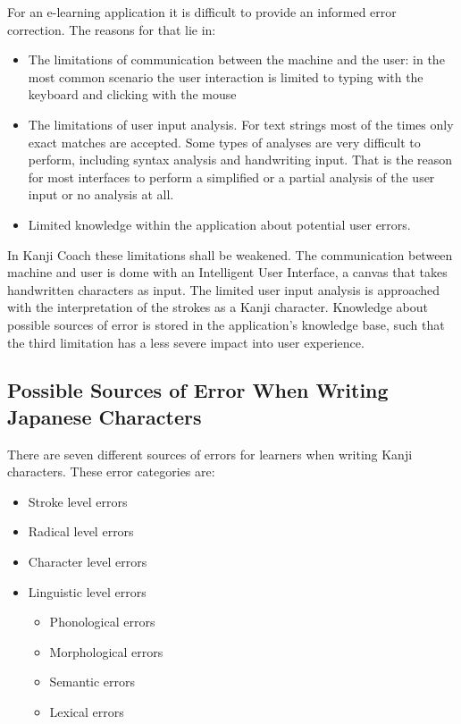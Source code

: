 For an e-learning application it is difficult to provide an informed error 
correction. The reasons for that lie in:
\begin{itemize}
  \item The limitations of communication between the machine and the user:
        in the most common scenario the user interaction is limited to
        typing with the keyboard and clicking with the mouse
  \item The limitations of user input analysis. For text strings most of the
        times only exact matches are accepted. Some types of analyses are very
        difficult to perform, including syntax analysis and handwriting input.
        That is the reason for most interfaces to perform a simplified
        or a partial analysis of the user input or no analysis at all.
  \item Limited knowledge within the application about potential user errors.
\end{itemize}
In Kanji Coach these limitations shall be weakened. The communication between
machine and user is dome with an Intelligent User Interface, a canvas that
takes handwritten characters as input. The limited user input analysis is
approached with the interpretation of the strokes as a Kanji character.
Knowledge about possible sources of error is stored in the application's 
knowledge base, such that the third limitation has a less severe impact into
user experience.

\subsection[Sources of Error]{Possible Sources of Error When Writing Japanese Characters}
\label{sec:concept:sourcesoferror}

There are seven different sources of errors for learners when writing Kanji 
characters. These error categories are:
\begin{itemize}
\item Stroke level errors
\item Radical level errors
\item Character level errors
\item Linguistic level errors
  \begin{itemize}
  \item Phonological errors
  \item Morphological errors
  \item Semantic errors
  \item Lexical errors
  \end{itemize}
\end{itemize}

